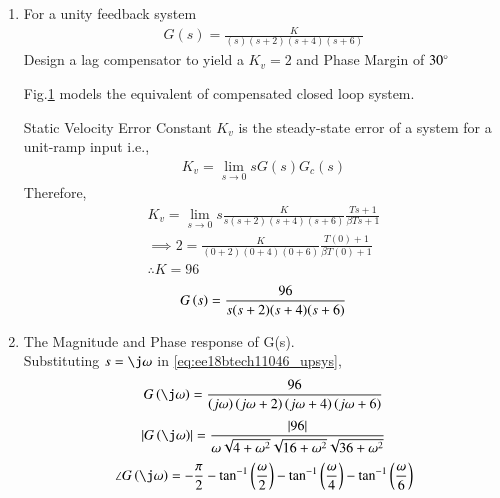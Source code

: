\begin{enumerate}[label=\thesection.\arabic*.,ref=\thesection.\theenumi]
\item For a unity feedback system 
\begin{align}
G(s) = \frac{K}{(s)(s+2)(s+4)(s+6)}
\label{eq:ee18btech11046_system}
\end{align}
Design a lag compensator to yield a $K_{v}=2$ and Phase Margin of $30\degree$


\solution
%
\solution Fig.\ref{fig:ee18btech11046_flow} models the equivalent of compensated closed loop system. 
 \begin{figure}[!ht]
	\begin{center}
		\resizebox{\columnwidth}{!}{}
	\end{center}
\caption{}
\label{fig:ee18btech11046_flow}
\end{figure}

%
Static Velocity Error Constant $K_{v}$ is the steady-state error of a system for a unit-ramp input i.e.,
\begin{align}
K_{v}=\lim _{s \rightarrow 0} s G(s) G_{c}(s)
\label{eq:ee18btech11046_compansatedsys}
\end{align}
Therefore,
\begin{multline}
K_{v}=\lim _{s \rightarrow 0} s \frac{K}{s(s+2)(s+4)(s+6)} \frac{Ts+1}{\beta Ts+1}
\\
\implies 
2 = \frac{K}{(0+2)(0+4)(0+6)} \frac{T(0)+1}{\beta T(0)+1}
\\
\therefore 
K = 96
\end{multline}
\begin{align}
G\left(s\right)=\frac{96}{s(s+2)(s+4)(s+6)}
\label{eq:ee18btech11046_upsys}
\end{align}


\item The Magnitude and Phase response of G(s).\\
\solution Substituting $s = \j\omega$ in \eqref{eq:ee18btech11046_upsys},
\begin{multline}
G\brak{\j\omega} =\frac{96}{\brak{j\omega}\brak{j\omega+2}\brak{j\omega+4}\brak{j\omega+6}} 
\end{multline}
\begin{multline}
\abs{G\brak{\j\omega}} = \frac{\abs{96}}{\omega\sqrt{4+\omega^2}\sqrt{16+\omega^2}\sqrt{36+\omega^2}}
\label{eq:ee18btech11046_gain}
\end{multline}
\begin{multline}
\angle G\brak{\j\omega} = -\frac{\pi}{2} -\tan^{-1}\brak{\frac{\omega}{2}}  - \tan^{-1}\brak{\frac{\omega}{4}} - \tan^{-1}\brak{\frac{\omega}{6}} 
\label{eq:ee18btech11046_phase}
\end{multline}


\end{enumerate}
